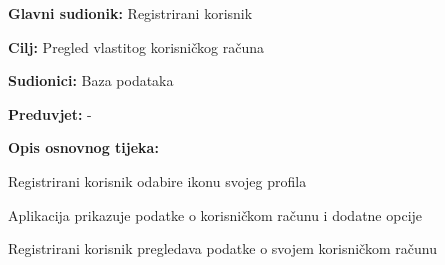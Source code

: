 				
				\noindent {}
				\begin{packed_item}
					
					\item \textbf{Glavni sudionik:} Registrirani korisnik
					\item  \textbf{Cilj:} Pregled vlastitog korisničkog računa
					\item  \textbf{Sudionici:} Baza podataka
					\item  \textbf{Preduvjet:} -
					
					\item  \textbf{Opis osnovnog tijeka:}
					\item[] \begin{packed_enum}
						\item Registrirani korisnik odabire ikonu svojeg profila
						\item Aplikacija prikazuje podatke o korisničkom računu i dodatne opcije
						\item Registrirani korisnik pregledava podatke o svojem korisničkom računu
					\end{packed_enum}
				\end{packed_item}
				

